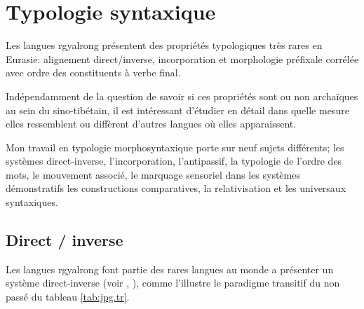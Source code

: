 \documentclass[oldfontcommands,oneside,a4paper,11pt]{memoir}
\begin{document}
\chapter{Typologie syntaxique} \label{chap:typologie}
Les langues rgyalrong présentent des propriétés typologiques très rares en Eurasie: alignement direct/inverse, incorporation et morphologie préfixale corrélée avec ordre des constituents à  verbe final.

Indépendamment de la question de savoir si ces propriétés sont ou non archaïques au sein du sino-tibétain, il est intéressant d'étudier en détail dans quelle mesure elles ressemblent ou diffèrent d'autres langues où elles apparaissent.

Mon travail en typologie morphosyntaxique porte sur neuf sujets différents; les systèmes direct-inverse, l'incorporation, l'antipassif, la typologie de l'ordre des mots, le mouvement associé, le marquage sensoriel dans les systèmes démonstratifs les constructions comparatives, la relativisation et les universaux syntaxiques.

\section{Direct / inverse}
Les langues rgyalrong font partie des rares langues au monde a présenter un système direct-inverse (voir \citealt{jacques10inverse}, \citealt{gongxun14agreement}), comme l'illustre le paradigme transitif du non passé du tableau \ref{tab:jpg.tr}.
\end{document}
